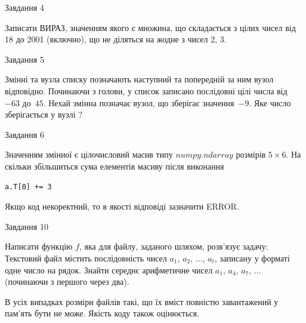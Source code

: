 \documentclass[12pt, ukrainian]{article}
\begin{document}
{               
{\begin{center}Завдання {4}\end{center}}
\vspace{-6mm}
Записати ВИРАЗ, значенням якого є множина, що складається з цілих чисел від 18 до 2001 (включно), що не діляться на жодне з чисел 2, 3.\par

\vspace{10mm}
               
{\begin{center}Завдання {5}\end{center}}
\vspace{-6mm}
Змінні  та  вузла списку позначають наступний та попередній за ним вузол відповідно. Починаючи з голови, у список записано послідовні цілі числа від~$-63$ до~$45$. Нехай змінна  позначає вузол, що зберігає значення~$-9$.
Яке число зберігається у вузлі  ?\par

               
{\begin{center}Завдання {6}\end{center}}
\vspace{-6mm}
Значенням змінної  є цілочисловий масив типу $numpy.ndarray$ розмірів $5{\times}6$. На скільки збільшиться сума елементів масиву  після виконання
\begin{verbatim}
a.T[0] += 3
\end{verbatim}


Якщо код некоректний, то в якості відповіді зазначити ERROR.\par

               
{\begin{center}Завдання {10}\end{center}}
\vspace{-6mm}

Написати функцію $f$, яка для файлу, заданого шляхом, розв’язує задачу:\\ Текстовий файл містить послідовність чисел $a_1$, $a_2$, $\ldots$, $a_t$, записану у форматі одне число на рядок. Знайти середнє арифметичне чисел $a_1$, $a_4$, $a_7$, $\ldots$ (починаючи з першого через два).

В усіх випадках розміри файлів такі, що їх вміст повністю завантажений у пам'ять бути не може. Якість коду також оцінюється.



\vspace{10mm}\par

}
\end{document}
